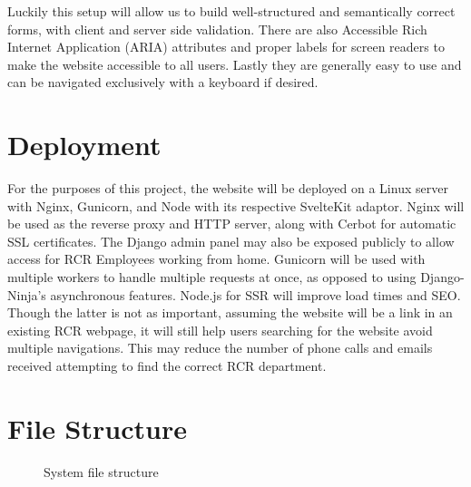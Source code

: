 Luckily this setup will allow us to build well-structured and semantically correct forms, with client and server side validation. There are also Accessible Rich Internet Application (ARIA) attributes and proper labels for screen readers to make the website accessible to all users. Lastly they are generally easy to use and can be navigated exclusively with a keyboard if desired. 

\section{Deployment}
For the purposes of this project, the website will be deployed on a Linux server with Nginx, Gunicorn, and Node with its respective SvelteKit adaptor. Nginx will be used as the reverse proxy and HTTP server, along with Cerbot for automatic SSL certificates. The Django admin panel may also be exposed publicly to allow access for RCR Employees working from home. Gunicorn will be used with multiple workers to handle multiple requests at once, as opposed to using Django-Ninja's asynchronous features. Node.js for SSR will improve load times and SEO. Though the latter is not as important, assuming the website will be a link in an existing RCR webpage, it will still help users searching for the website avoid multiple navigations. This may reduce the number of phone calls and emails received attempting to find the correct RCR department.


\section{File Structure} \label{File Structure}
\begin{figure}[h]
\centering
{}
\vspace{-20pt}
\caption{System file structure}
\label{fig:file-design}
\vspace{-5pt}
\end{figure}
